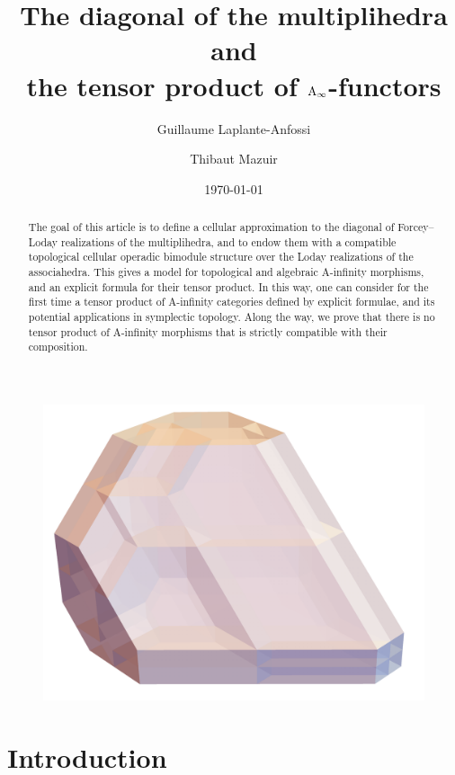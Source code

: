 \documentclass[twoside, 12pt]{amsart}
\title[The diagonal of the multiplihedra]{The diagonal of the multiplihedra and \\ the tensor product of $\mathrm{A}_\infty$-functors}
\author{Guillaume Laplante-Anfossi}
\author{Thibaut Mazuir}
\date{\today}
\theoremstyle{remark}
\begin{document}
\begin{abstract}
The goal of this article is to define a cellular approximation to the diagonal of Forcey--Loday realizations of the multiplihedra, and to endow them with a compatible topological cellular operadic bimodule structure over the Loday realizations of the associahedra. 
This gives a model for topological and algebraic A-infinity morphisms, and an explicit formula for their tensor product.
In this way, one can consider for the first time a tensor product of A-infinity categories defined by explicit formulae, and its potential applications in symplectic topology. 
Along the way, we prove that there is no tensor product of A-infinity morphisms that is strictly compatible with their composition. 
\end{abstract}

\maketitle

\begin{figure}[h!]
\centering
\includegraphics[width=0.7\linewidth]{J4.png} 
\label{Fig5:J4}
\end{figure}

\setcounter{tocdepth}{1}
\tableofcontents


\section*{Introduction}


\end{document}
